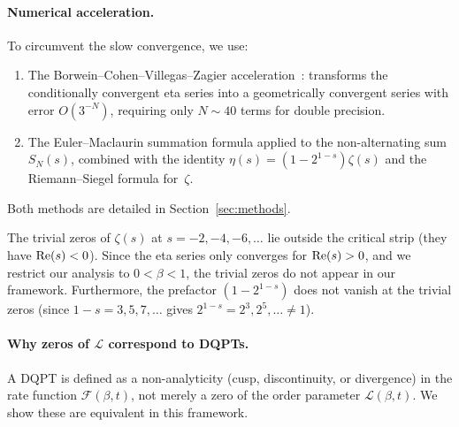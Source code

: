 \paragraph{Numerical acceleration.}
To circumvent the slow convergence, we use:
\begin{enumerate}
  \item[(a)] The Borwein--Cohen--Villegas--Zagier acceleration~\cite{borwein2000}:
    transforms the conditionally convergent eta series into a geometrically convergent
    series with error $O(3^{-N})$, requiring only $N \sim 40$ terms for double precision.
  \item[(b)] The Euler--Maclaurin summation formula applied to the non-alternating sum
    $S_N(s)$, combined with the identity $\eta(s) = (1-2^{1-s})\zeta(s)$ and the
    Riemann--Siegel formula for~$\zeta$.
\end{enumerate}
Both methods are detailed in Section~\ref{sec:methods}.

\begin{remark}\label{rem:trivial}
The trivial zeros of $\zeta(s)$ at $s = -2,-4,-6,\ldots$ lie outside the critical strip
(they have $\operatorname{Re}(s) < 0$). Since the eta series only converges for $\operatorname{Re}(s) > 0$, and we
restrict our analysis to $0 < \beta < 1$, the trivial zeros do not appear in our
framework. Furthermore, the prefactor $(1-2^{1-s})$ does not vanish at the trivial zeros
(since $1-s = 3,5,7,\ldots$ gives $2^{1-s} = 2^3,2^5,\ldots \ne 1$).
\end{remark}

\paragraph{Why zeros of $\mathcal{L}$ correspond to DQPTs.}
A DQPT is defined as a non-analyticity (cusp, discontinuity, or divergence) in the rate
function $\mathcal{F}(\beta,t)$, not merely a zero of the order parameter
$\mathcal{L}(\beta,t)$. We show these are equivalent in this framework.

